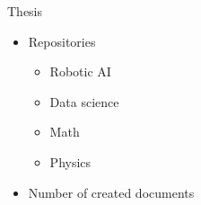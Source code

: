 \begin{frame}[allowframebreaks]{Thesis}
    \begin{itemize}
        \item Repositories
        \begin{itemize}
            \item Robotic AI
            \item Data science
            \item Math
            \item Physics
        \end{itemize}
        \item Number of created documents
    \end{itemize}
\end{frame}